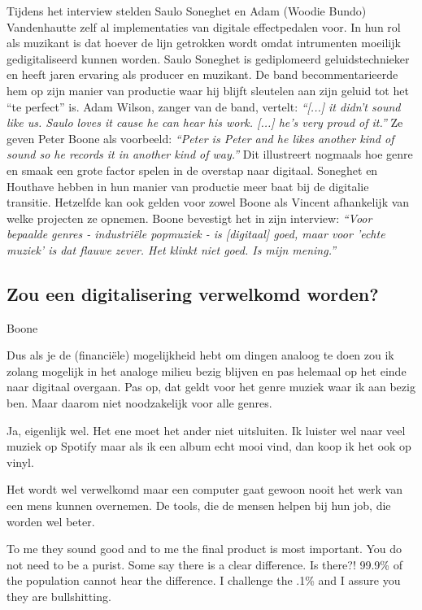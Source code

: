 Tijdens het interview stelden Saulo Soneghet en Adam (Woodie Bundo) Vandenhautte zelf al implementaties van digitale effectpedalen voor. In hun rol als muzikant is dat hoever de lijn getrokken wordt omdat intrumenten moeilijk gedigitaliseerd kunnen worden. Saulo Soneghet is gediplomeerd geluidstechnieker en heeft jaren ervaring als producer en muzikant. De band becommentarieerde hem op zijn manier van productie waar hij blijft sleutelen aan zijn geluid tot het ``te perfect'' is. Adam Wilson, zanger van de band, vertelt: \textit{``[...] it didn't sound like us. Saulo loves it cause he can hear his work. [...] he's very proud of it.''} Ze geven Peter Boone als voorbeeld: \textit{``Peter is Peter and he likes another kind of sound so he records it in another kind of way.''} Dit illustreert nogmaals hoe genre en smaak een grote factor spelen in de overstap naar digitaal. Soneghet en Houthave hebben in hun manier van productie meer baat bij de digitalie transitie. Hetzelfde kan ook gelden voor zowel Boone als Vincent afhankelijk van welke projecten ze opnemen. Boone bevestigt het in zijn interview: \textit{``Voor bepaalde genres - industriële popmuziek - is [digitaal] goed, maar voor 'echte muziek' is dat flauwe zever. Het klinkt niet goed. Is mijn mening.''}

\subsection{Zou een digitalisering verwelkomd worden?}

Boone

Dus als je de (financiële) mogelijkheid hebt om dingen analoog te doen zou ik zolang mogelijk in het analoge milieu bezig blijven en pas helemaal op het einde naar digitaal overgaan.
Pas op, dat geldt voor het genre muziek waar ik aan bezig ben. Maar daarom niet noodzakelijk voor alle genres.

Ja, eigenlijk wel. Het ene moet het ander niet uitsluiten. Ik luister wel naar veel muziek op Spotify maar als ik een album echt mooi vind, dan koop ik het ook op vinyl.

Het wordt wel verwelkomd maar een computer gaat gewoon nooit het werk van een mens kunnen overnemen.
De tools, die de mensen helpen bij hun job, die worden wel beter.

To me they sound good and to me the final product is most important. You do not need to be a purist. Some say there is a clear difference. Is there?!
99.9\% of the population cannot hear the difference. I challenge the .1\% and I assure you they are bullshitting.

